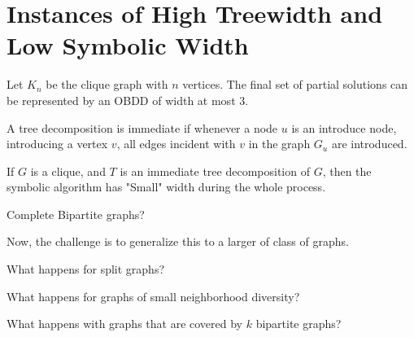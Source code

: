 \section{Instances of High Treewidth and Low Symbolic Width}


\begin{proposition}
\label{proposition:WidthClique}
Let $K_n$ be the clique graph with $n$ vertices. The final set of partial solutions can be represented by an OBDD of width at most $3$.
\end{proposition}

A tree decomposition is immediate if whenever a node $u$ is an introduce node, introducing a vertex $v$, all edges incident with $v$ in the graph $G_u$ are introduced. 


\begin{conjecture}
\label{conjecture:CliquesSmallWidth}
If $G$ is a clique, and $T$ is an immediate tree decomposition of $G$, then the symbolic algorithm has "Small" width during the whole process.  
\end{conjecture}

\begin{conjecture}
Complete Bipartite graphs? 
\end{conjecture}


Now, the challenge is to generalize this to a larger of class of graphs. 

\begin{conjecture}
\label{generalization:}
What happens for split graphs? 
\end{conjecture}


\begin{conjecture}
\label{generalization:}
What happens for graphs of small neighborhood diversity?
\end{conjecture}

\begin{conjecture}
What happens with graphs that are covered by $k$ bipartite graphs? 
\end{conjecture}





